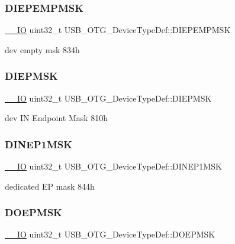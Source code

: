 \subsubsection{\texorpdfstring{DIEPEMPMSK}{DIEPEMPMSK}}
{\footnotesize\ttfamily \mbox{\hyperlink{core__sc300_8h_aec43007d9998a0a0e01faede4133d6be}{\+\_\+\+\_\+\+IO}} uint32\+\_\+t U\+S\+B\+\_\+\+O\+T\+G\+\_\+\+Device\+Type\+Def\+::\+D\+I\+E\+P\+E\+M\+P\+M\+SK}

dev empty msk 834h \mbox{\label{struct_u_s_b___o_t_g___device_type_def_a98f214f983aa10b4a7adbddcfe086bf6}} 
\subsubsection{\texorpdfstring{DIEPMSK}{DIEPMSK}}
{\footnotesize\ttfamily \mbox{\hyperlink{core__sc300_8h_aec43007d9998a0a0e01faede4133d6be}{\+\_\+\+\_\+\+IO}} uint32\+\_\+t U\+S\+B\+\_\+\+O\+T\+G\+\_\+\+Device\+Type\+Def\+::\+D\+I\+E\+P\+M\+SK}

dev IN Endpoint Mask 810h \mbox{\label{struct_u_s_b___o_t_g___device_type_def_a6dccbd3d18fe0e4e552aefc9f6f469fa}} 
\subsubsection{\texorpdfstring{DINEP1MSK}{DINEP1MSK}}
{\footnotesize\ttfamily \mbox{\hyperlink{core__sc300_8h_aec43007d9998a0a0e01faede4133d6be}{\+\_\+\+\_\+\+IO}} uint32\+\_\+t U\+S\+B\+\_\+\+O\+T\+G\+\_\+\+Device\+Type\+Def\+::\+D\+I\+N\+E\+P1\+M\+SK}

dedicated EP mask 844h \mbox{\label{struct_u_s_b___o_t_g___device_type_def_ae446389c3fb6d62537abe36a0d7e564f}} 
\subsubsection{\texorpdfstring{DOEPMSK}{DOEPMSK}}
{\footnotesize\ttfamily \mbox{\hyperlink{core__sc300_8h_aec43007d9998a0a0e01faede4133d6be}{\+\_\+\+\_\+\+IO}} uint32\+\_\+t U\+S\+B\+\_\+\+O\+T\+G\+\_\+\+Device\+Type\+Def\+::\+D\+O\+E\+P\+M\+SK}

